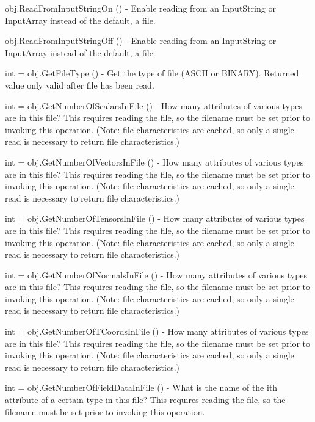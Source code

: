 \begin{DoxyItemize}
\item {\ttfamily obj.\-Read\-From\-Input\-String\-On ()} -\/ Enable reading from an Input\-String or Input\-Array instead of the default, a file.  
\item {\ttfamily obj.\-Read\-From\-Input\-String\-Off ()} -\/ Enable reading from an Input\-String or Input\-Array instead of the default, a file.  
\item {\ttfamily int = obj.\-Get\-File\-Type ()} -\/ Get the type of file (A\-S\-C\-I\-I or B\-I\-N\-A\-R\-Y). Returned value only valid after file has been read.  
\item {\ttfamily int = obj.\-Get\-Number\-Of\-Scalars\-In\-File ()} -\/ How many attributes of various types are in this file? This requires reading the file, so the filename must be set prior to invoking this operation. (Note\-: file characteristics are cached, so only a single read is necessary to return file characteristics.)  
\item {\ttfamily int = obj.\-Get\-Number\-Of\-Vectors\-In\-File ()} -\/ How many attributes of various types are in this file? This requires reading the file, so the filename must be set prior to invoking this operation. (Note\-: file characteristics are cached, so only a single read is necessary to return file characteristics.)  
\item {\ttfamily int = obj.\-Get\-Number\-Of\-Tensors\-In\-File ()} -\/ How many attributes of various types are in this file? This requires reading the file, so the filename must be set prior to invoking this operation. (Note\-: file characteristics are cached, so only a single read is necessary to return file characteristics.)  
\item {\ttfamily int = obj.\-Get\-Number\-Of\-Normals\-In\-File ()} -\/ How many attributes of various types are in this file? This requires reading the file, so the filename must be set prior to invoking this operation. (Note\-: file characteristics are cached, so only a single read is necessary to return file characteristics.)  
\item {\ttfamily int = obj.\-Get\-Number\-Of\-T\-Coords\-In\-File ()} -\/ How many attributes of various types are in this file? This requires reading the file, so the filename must be set prior to invoking this operation. (Note\-: file characteristics are cached, so only a single read is necessary to return file characteristics.)  
\item {\ttfamily int = obj.\-Get\-Number\-Of\-Field\-Data\-In\-File ()} -\/ What is the name of the ith attribute of a certain type in this file? This requires reading the file, so the filename must be set prior to invoking this operation.  

\end{DoxyItemize}
